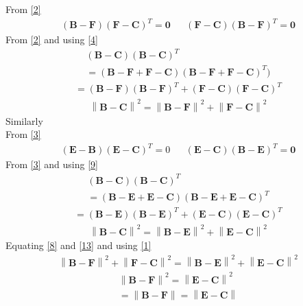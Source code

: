 \documentclass[journal,12pt,twocolumn]{IEEEtran}
\let\vec\mathbf
\newcommand{\norm}[1]{\left\lVert#1\right\rVert}
\begin{document}
From \eqref{2}
\begin{align}
    \left(\vec{B}-\vec{F}\right)\left(\vec{F}-\vec{C}\right)^T=\vec{0} && \left(\vec{F}-\vec{C}\right)\left(\vec{B}-\vec{F}\right)^T=\vec{0}\label{4}
\end{align}
From \eqref{2} and using \eqref{4} 
\begin{align}
    \left(\vec{B}-\vec{C}\right)\left(\vec{B}-\vec{C}\right)^T\\
    =\left(\vec{B}-\vec{F}+\vec{F}-\vec{C}\right)\left(\vec{B}-\vec{F}+\vec{F}-\vec{C}\right)^T)
    \end{align}
    \begin{align}
      =\left(\vec{B}-\vec{F}\right)\left(\vec{B}-\vec{F}\right)^T+\left(\vec{F}-\vec{C}\right)\left(\vec{F}-\vec{C}\right)^T 
    \end{align}
\begin{align}
   \norm{\vec{B}-\vec{C}}^2=\norm{\vec{B}-\vec{F}}^2+\norm{\vec{F}-\vec{C}}^2\label{8} 
    \end{align}
    Similarly\\
    From \eqref{3}
    \begin{align}
        \left(\vec{E}-\vec{B}\right)\left(\vec{E}-\vec{C}\right)^T=0 && \left(\vec{E}-\vec{C}\right)\left(\vec{B}-\vec{E}\right)^T=\vec{0}\label{9}
        \end{align}
From  \eqref{3} and using \eqref{9}  
\begin{align}
    \left(\vec{B}-\vec{C}\right)\left(\vec{B}-\vec{C}\right)^T\\
    =\left(\vec{B}-\vec{E}+\vec{E}-\vec{C}\right)\left(\vec{B}-\vec{E}+\vec{E}-\vec{C}\right)^T
    \end{align}
    \begin{align}
      =\left(\vec{B}-\vec{E}\right)\left(\vec{B}-\vec{E}\right)^T+\left(\vec{E}-\vec{C}\right)\left(\vec{E}-\vec{C}\right)^T 
    \end{align}
\begin{align}
   \norm{\vec{B}-\vec{C}}^2=\norm{\vec{B}-\vec{E}}^2+\norm{\vec{E}-\vec{C}}^2\label{13}
    \end{align}        
    Equating \eqref{8} and \eqref{13} and using \eqref{1}
    \begin{align}
      \norm{\vec{B}-\vec{F}}^2+\norm{\vec{F}-\vec{C}}^2 = \norm{\vec{B}-\vec{E}}^2+\norm{\vec{E}-\vec{C}}^2  
    \end{align}
    \begin{align}
       \norm{\vec{B}-\vec{F}}^2=\norm{\vec{E}-\vec{C}}^2\\
       =\norm{\vec{B}-\vec{F}}=\norm{\vec{E}-\vec{C}}\label{16}
    \end{align}
    
\end{document}
